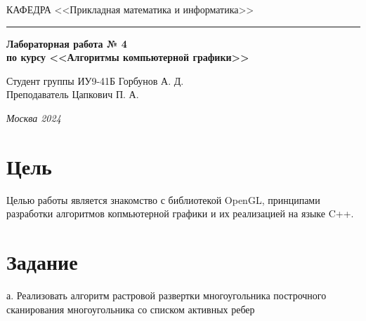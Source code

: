 \documentclass[a4paper, 14pt]{extarticle}
\begin{document}
\begin{titlepage}
\vspace{0.5ex}
\hspace{-35pt} \noindent \small КАФЕДРА\hspace{50pt} <<Прикладная математика и информатика>>

\vspace*{-16pt}
\hspace{30pt}\rule{0.866\textwidth}{0.4pt}
  
\vspace{11em}

\begin{center}
\Large {\bf Лабораторная работа № 4} \\ 
\large {\bf по курсу <<Алгоритмы компьютерной графики>>}\\
\end{center}\normalsize

\vspace{8em}


\begin{flushright}
  {Студент группы ИУ9-41Б Горбунов А. Д.\hspace*{15pt} \\
  \vspace{2ex}
  Преподаватель Цапкович П. А.\hspace*{15pt}}
\end{flushright}

\bigskip

\vfill
 

\begin{center}
\textsl{Москва 2024}
\end{center}
\end{titlepage}

\renewcommand{\ttdefault}{pcr}

\setlength{\tabcolsep}{3pt}
\newpage
\setcounter{page}{2}

\section{Цель}\label{Sect::task}
\par
Целью работы является знакомство с  библиотекой OpenGL, принципами разработки алгоритмов копмьютерной графики и их реализацией на языке C++.
\section{Задание}\label{Sect::task}
\par
а. Реализовать алгоритм растровой развертки многоугольника построчного сканирования многоугольника со списком активных ребер
\end{document}

